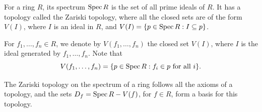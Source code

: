\begin{definition}
    For a ring $R$, its spectrum $\operatorname{Spec} R$ is the set of all prime ideals of $R$. It has a topology called the Zariski topology, where all the closed sets are of the form $V(I)$, where $I$ is an ideal in $R$, and $V(I) = \{ p \in \operatorname{Spec} R : I \subseteq p \}$.
  \end{definition}
  \begin{remark}
    For \(f_1,\dots, f_n \in R\), we denote by \(V(f_1,\dots,f_n)\) the closed set \(V(I)\), where \(I\) is the ideal generated by \(f_1,\dots,f_n\).
    Note that \[V(f_1,\dots,f_n) = \{p \in \operatorname{Spec} R : f_i \in p \text{ for all } i\}.\]
  \end{remark}
\begin{theorem}
    The Zariski topology on the spectrum of a ring follows all the axioms of a topology, and the sets $D_f = \operatorname{Spec} R - V(f)$, for $f \in R$, form a basis for this topology.
\end{theorem}
